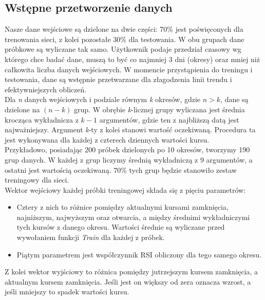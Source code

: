 \documentclass[a4paper]{article}
\begin{document}
	\subsection{Wstępne przetworzenie danych}\label{subsec:przetworzenie}\indent\indent
		Nasze dane wejściowe są dzielone na dwie części: 70\% jest poświęconych dla trenowania sieci, z kolei pozostałe 30\% dla testowania. W obu grupach dane próbkowe są wyliczane tak samo. Użytkownik podaje przedział czasowy wg którego chce badać dane, muszą to być co najmniej 3 dni (okresy) oraz mniej niż całkowita liczba danych wejściowych. W momencie przystąpienia do treningu i testowania, dane są wstępnie przetwarzane dla złagodzenia linii trendu i efektywniejszych obliczeń.\\\indent
		Dla \textit{n} danych wejściowych i podziale równym \textit{k} okresów, gdzie $ n > k $, dane są dzielone na $ (n-k) $ grup. W obrębie \textit{k}-licznej grupy wyliczana jest średnia krocząca wykładnicza z $ k-1 $ argumentów, gdzie ten z najbliższą datą jest najważniejszy. Argument \textit{k}-ty z kolei stanowi wartość oczekiwaną. Procedura ta jest wykonywana dla każdej z czterech dziennych wartości kursu.\\\indent
		Przykładowo, posiadając 200 próbek dzielonych po 10 okresów, tworzymy 190 grup danych. W każdej z grup liczymy średnią wykładniczą z 9 argumentów, a ostatni jest wartością oczekiwaną. 70\% tych grup będzie stanowiło zestaw treningowy dla sieci.\\\indent
		Wektor wejściowy każdej próbki treningowej składa się z pięciu parametrów:
		\begin{itemize}
			\item Cztery z nich to różnice pomiędzy aktualnymi kursami zamknięcia, najniższym, najwyższym oraz otwarcia, a między średnimi wykładniczymi tych kursów z danego okresu. Wartości średnie są wyliczane przed wywołaniem funkcji \textit{Train} dla każdej z próbek.
			\item Piątym parametrem jest współczynnik RSI obliczony dla tego samego okresu.
		\end{itemize}\indent\indent
		Z kolei wektor wyjściowy to różnica pomiędzy jutrzejszym kursem zamknięcia, a aktualnym kursem zamknięcia. Jeśli jest on większy od zera oznacza wzrost, a jeśli mniejszy to spadek wartości kursu.
\end{document}
